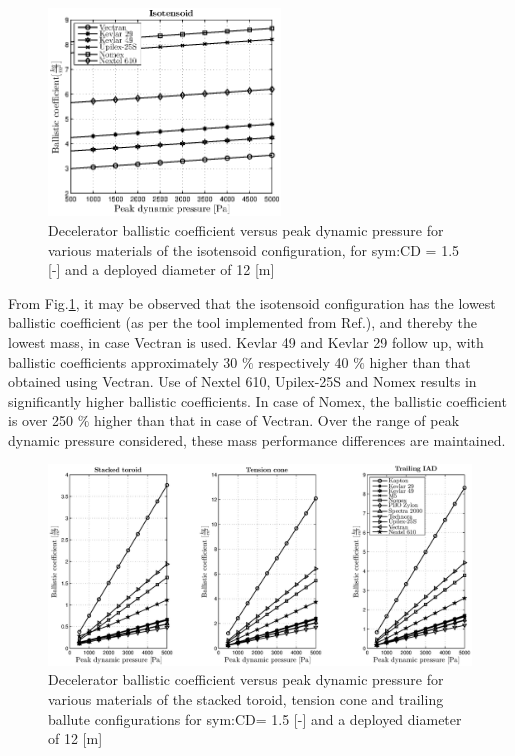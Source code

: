 \begin{figure}[H]
\centering
\includegraphics[width = 0.55\textwidth]{Figure/ISO_mat.eps}
\caption{Decelerator ballistic coefficient versus peak dynamic pressure for various materials of the isotensoid configuration, for \gls{sym:CD} = 1.5 [-] and a deployed diameter of 12 [m]}
\label{fig:ISO_mat}
\end{figure}
From Fig.\ref{fig:ISO_mat}, it may be observed that the isotensoid configuration has the lowest ballistic coefficient (as per the tool implemented from Ref.\cite{Anderson1969}), and thereby the lowest mass, in case Vectran is used. Kevlar 49 and Kevlar 29 follow up, with ballistic coefficients approximately 30 $\%$ respectively 40 $\%$ higher than that obtained using Vectran. Use of Nextel 610, Upilex-25S and Nomex results in significantly higher ballistic coefficients. In case of Nomex, the ballistic coefficient is over 250 $\%$ higher than that in case of Vectran. Over the range of peak dynamic pressure considered, these mass performance differences are maintained. 

\begin{figure}[H]
\hspace{-35mm}
\includegraphics[width = 1.35\textwidth]{Figure/all_mat.eps}
\caption{Decelerator ballistic coefficient versus peak dynamic pressure for various materials of the stacked toroid, tension cone and trailing ballute configurations for \gls{sym:CD}= 1.5 [-] and a deployed diameter of 12 [m]}
\label{fig:all_mat}
\end{figure}

